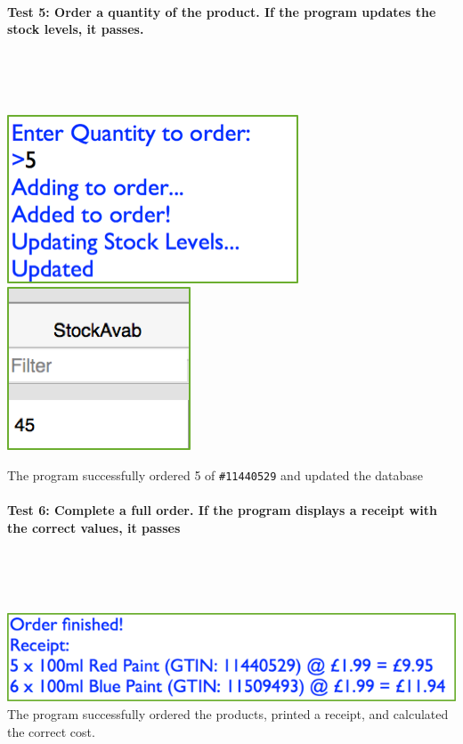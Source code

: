 \documentclass[a4paper]{article}
\begin{document}
\paragraph{Test 5: Order a quantity of the product. If the program updates the stock levels, it passes.} ~\par ~\par
\noindent\includegraphics{testing_12.png}
\noindent\includegraphics{testing_13.png} \par
The program successfully ordered 5 of \verb|#11440529| and updated the database
\paragraph{Test 6: Complete a full order. If the program displays a receipt with the correct values, it passes} ~\par ~\par
\noindent\includegraphics{testing_14.png}
The program successfully ordered the products, printed a receipt, and calculated the correct cost.
\end{document}
